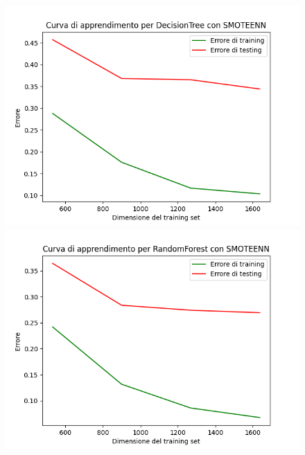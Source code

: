 \begin{figure}[H]
    \centering
    \begin{minipage}[b]{0.45\linewidth}
      \centering
      \includegraphics[scale=0.5]{img/learning_curve_DecisionTree_SMOTEENN.png}
      
    \end{minipage}
    \hfill
    \begin{minipage}[b]{0.45\linewidth}
      \centering
      \includegraphics[scale=0.5]{img/learning_curve_RandomForest_SMOTEENN.png}
      
    \end{minipage}
    

\end{figure}
